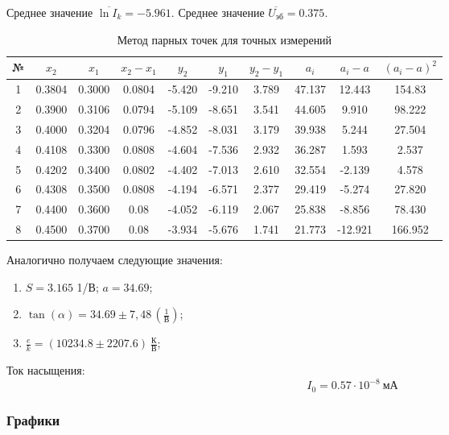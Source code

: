 Среднее значение $\overline{\ln I_k} = -5.961$.
Среднее значение $\overline{U_{\text{эб}}} = 0.375$. 
\begin{center}
\begin{table}[h!]
\caption{Метод парных точек для точных измерений}
\begin{tabular}{|c|c|c|c|c|c|c|c|c|c|}

\hline
№ & $x_2$ & $x_1$ & $x_2 - x_1$ & $y_2$ & $y_1$ & $y_2 - y_1$ & $a_i$ & $a_i - a$ & $(a_i - a)^2$ \\
\hline
1 & 0.3804 & 0.3000 & 0.0804 & -5.420 & -9.210 & 3.789 & 47.137 & 12.443 & 154.83 \\ 
2 & 0.3900 & 0.3106 & 0.0794 & -5.109 & -8.651 & 3.541 & 44.605 & 9.910 & 98.222 \\ 
3 & 0.4000 & 0.3204 & 0.0796 & -4.852 & -8.031 & 3.179 & 39.938 & 5.244 & 27.504 \\ 
4 & 0.4108 & 0.3300 & 0.0808 & -4.604 & -7.536 & 2.932 & 36.287 & 1.593 & 2.537 \\ 
5 & 0.4202 & 0.3400 & 0.0802 & -4.402 & -7.013 & 2.610 & 32.554 & -2.139 & 4.578 \\ 
6 & 0.4308 & 0.3500 & 0.0808 & -4.194 & -6.571 & 2.377 & 29.419 & -5.274 & 27.820 \\ 
7 & 0.4400 & 0.3600 & 0.08 & -4.052 & -6.119 & 2.067 & 25.838 & -8.856 & 78.430 \\ 
8 & 0.4500 & 0.3700 & 0.08 & -3.934 & -5.676 & 1.741 & 21.773 & -12.921 & 166.952 \\ 


\hline
\end{tabular}
\end{table}
\end{center}

Аналогично получаем следующие значения: 
\begin{enumerate}
    \item$S=3.165$ 1/В;
     $a=34.69$;
    \item$\tan(\alpha) = 34.69 \pm 7,48 \, \left(\frac{1}{\text{В}}\right)$;
    \item$\frac{e}{k} = (10234.8 \pm 2207.6)~\frac{\text{К}}{\text{В}}$;
\end{enumerate}
Ток насыщения:
\[
I_0 = 0.57 \cdot 10^{-8}~\text{мА}
\]

\subsubsection{Графики}



